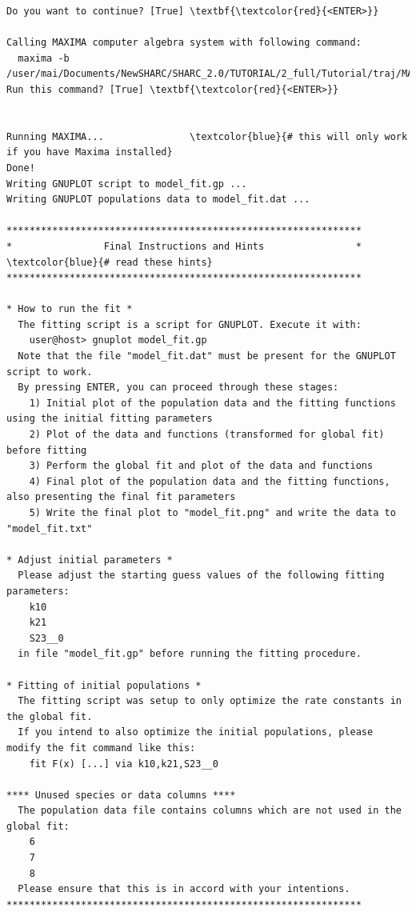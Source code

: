 \documentclass[a4paper,11pt,DIV=15,openany]{scrbook}
\begin{document}
\begin{oframed}
\begin{Verbatim}[commandchars=\\\{\}]
Do you want to continue? [True] \textbf{\textcolor{red}{<ENTER>}}

Calling MAXIMA computer algebra system with following command:
  maxima -b /user/mai/Documents/NewSHARC/SHARC_2.0/TUTORIAL/2_full/Tutorial/traj/MAXIMA.input
Run this command? [True] \textbf{\textcolor{red}{<ENTER>}}


Running MAXIMA...               \textcolor{blue}{# this will only work if you have Maxima installed}
Done!
Writing GNUPLOT script to model_fit.gp ...
Writing GNUPLOT populations data to model_fit.dat ...

**************************************************************
*                Final Instructions and Hints                *    \textcolor{blue}{# read these hints}
**************************************************************

* How to run the fit *
  The fitting script is a script for GNUPLOT. Execute it with:
    user@host> gnuplot model_fit.gp
  Note that the file "model_fit.dat" must be present for the GNUPLOT script to work.
  By pressing ENTER, you can proceed through these stages:
    1) Initial plot of the population data and the fitting functions using the initial fitting parameters
    2) Plot of the data and functions (transformed for global fit) before fitting
    3) Perform the global fit and plot of the data and functions
    4) Final plot of the population data and the fitting functions, also presenting the final fit parameters
    5) Write the final plot to "model_fit.png" and write the data to "model_fit.txt"

* Adjust initial parameters *
  Please adjust the starting guess values of the following fitting parameters:
    k10
    k21
    S23__0
  in file "model_fit.gp" before running the fitting procedure.

* Fitting of initial populations *
  The fitting script was setup to only optimize the rate constants in the global fit.
  If you intend to also optimize the initial populations, please modify the fit command like this:
    fit F(x) [...] via k10,k21,S23__0

**** Unused species or data columns ****
  The population data file contains columns which are not used in the global fit:
    6
    7
    8
  Please ensure that this is in accord with your intentions.
**************************************************************
\end{Verbatim}
\end{oframed}

\normalsize
\end{document}
